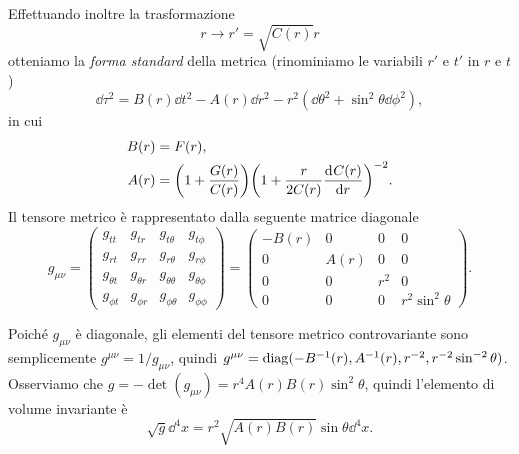 Effettuando inoltre la trasformazione 
\begin{equation}
  r \to r' = \sqrt{C(r)}r
\end{equation}
otteniamo la \emph{forma standard} della
metrica (rinominiamo le variabili $r'$ e $t'$ in $r$ e $t$)
\begin{equation}
  \label{eq:metrica-standard}
  \dd\tau^{2} = B(r)\dd t^{2} - A(r)\dd r^{2} - r^{2}(\dd\theta^{2} +
  \sin^{2}\theta \dd\phi^{2}),
\end{equation}
in cui
\begin{subequations}
  \begin{align}
    B(r) &= F(r), \\
    A(r) &= \bigg(1 + \frac{G(r)}{C(r)} \bigg) \bigg( 1 + \frac{r}{2C(r)}
           \frac{{\mathop{}\!\mathrm{d}^{}}C(r)}{\mathop{}\!\mathrm{d} {r}^{}} \bigg)^{-2}.
  \end{align}
\end{subequations}
Il tensore metrico è rappresentato dalla seguente matrice diagonale
\begin{equation}
  g_{\mu\nu} =
  \begin{pmatrix}
    g_{tt}       & g_{tr}       & g_{t\theta}      & g_{t\phi}      \\
    g_{rt}       & g_{rr}       & g_{r\theta}      & g_{r\phi}      \\
    g_{\theta t} & g_{\theta r} & g_{\theta\theta} & g_{\theta\phi} \\
    g_{\phi t}   & g_{\phi r}   & g_{\phi\theta}   & g_{\phi\phi}
  \end{pmatrix}
  =
  \begin{pmatrix}
    -B(r) & 0    & 0     & 0 \\
    0     & A(r) & 0     & 0 \\
    0     & 0    & r^{2} & 0 \\
    0     & 0    & 0     & r^{2}\sin^{2}\theta
  \end{pmatrix}.
\end{equation}

Poiché $g_{\mu\nu}$ è diagonale, gli elementi del tensore metrico controvariante
sono semplicemente $g^{\mu\nu} = 1/g_{\mu\nu}$, quindi
$g^{\mu\nu} = \operatorname{diag}(-B^{-1}(r), A^{-1}(r), r^{-2}, r^{-2}\sin^{-2}\theta)$.
Osserviamo che $g = -\det(g_{\mu\nu}) = r^{4}A(r)B(r)\sin^{2}\theta$, quindi
l'elemento di volume invariante è
\begin{equation}
  \sqrt{g} \dd^{4} x = r^{2}\sqrt{A(r) B(r)} \sin\theta \dd^{4} x.
\end{equation}

